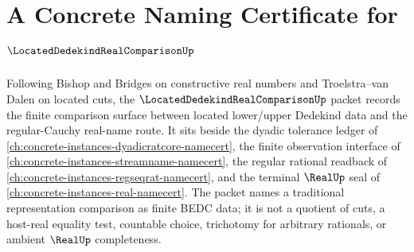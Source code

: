 \chapter{A Concrete Naming Certificate for $\LocatedDedekindRealComparisonUp$}
\label{ch:concrete-instances-located-dedekind-real-comparison-namecert}

Following Bishop and Bridges on constructive real numbers and Troelstra--van Dalen on located cuts, the $\LocatedDedekindRealComparisonUp$ packet records the finite comparison surface between located lower/upper Dedekind data and the regular-Cauchy real-name route. It sits beside the dyadic tolerance ledger of \autoref{ch:concrete-instances-dyadicratcore-namecert}, the finite observation interface of \autoref{ch:concrete-instances-streamname-namecert}, the regular rational readback of \autoref{ch:concrete-instances-regseqrat-namecert}, and the terminal $\RealUp$ seal of \autoref{ch:concrete-instances-real-namecert}. The packet names a traditional representation comparison as finite BEDC data; it is not a quotient of cuts, a host-real equality test, countable choice, trichotomy for arbitrary rationals, or ambient $\RealUp$ completeness.

